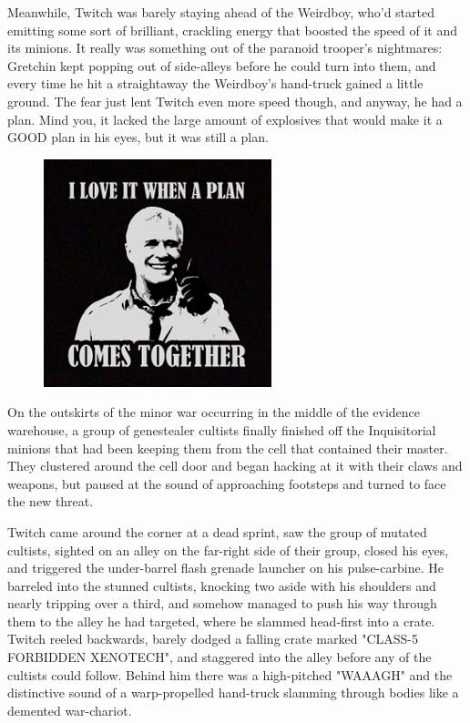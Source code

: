 Meanwhile, Twitch was barely staying ahead of the Weirdboy, who'd started emitting some sort of brilliant, crackling energy that boosted the speed of it and its minions. 
It really was something out of the paranoid trooper's nightmares: 
Gretchin kept popping out of side-alleys before he could turn into them, and every time he hit a straightaway the Weirdboy's hand-truck gained a little ground. 
The fear just lent Twitch even more speed though, and anyway, he had a plan. 
Mind you, it lacked the large amount of explosives that would make it a GOOD plan in his eyes, but it was still a plan.

\begin{figure}
	\begin{center}
		\includegraphics[width=\figwidth]{pics/16/34.png}
	\end{center}
\end{figure}
On the outskirts of the minor war occurring in the middle of the evidence warehouse, a group of genestealer cultists finally finished off the Inquisitorial minions that had been keeping them from the cell that contained their master. 
They clustered around the cell door and began hacking at it with their claws and weapons, but paused at the sound of approaching footsteps and turned to face the new threat. 


Twitch came around the corner at a dead sprint, saw the group of mutated cultists, sighted on an alley on the far-right side of their group, closed his eyes, and triggered the under-barrel flash grenade launcher on his pulse-carbine. 
He barreled into the stunned cultists, knocking two aside with his shoulders and nearly tripping over a third, and somehow managed to push his way through them to the alley he had targeted, where he slammed head-first into a crate. 
Twitch reeled backwards, barely dodged a falling crate marked "CLASS-5 FORBIDDEN XENOTECH", and staggered into the alley before any of the cultists could follow. 
Behind him there was a high-pitched "WAAAGH" and the distinctive sound of a warp-propelled hand-truck slamming through bodies like a demented war-chariot.

